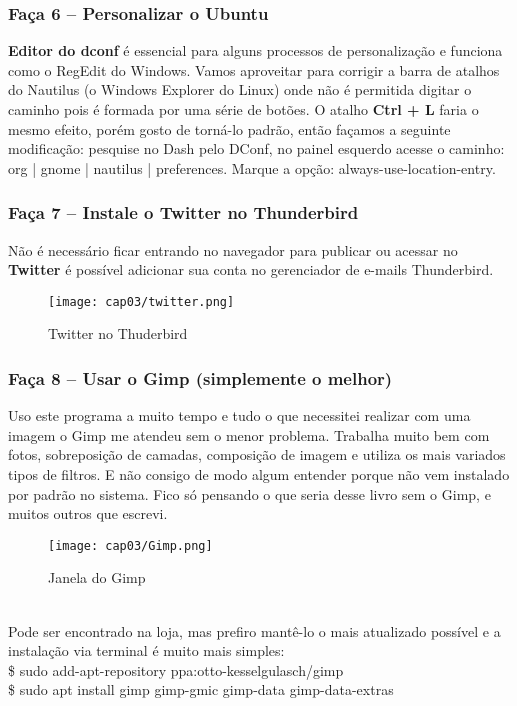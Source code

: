 \subsubsection{Faça 6 – Personalizar o Ubuntu}
\textbf{Editor do dconf} é essencial para alguns processos de personalização e funciona como o RegEdit do Windows. Vamos aproveitar para corrigir a barra de atalhos do Nautilus (o Windows Explorer do Linux) onde não é permitida digitar o caminho pois é formada por uma série de botões. O atalho \textbf{Ctrl + L} faria o mesmo efeito, porém gosto de torná-lo padrão, então façamos a seguinte modificação: pesquise no Dash pelo DConf, no painel esquerdo acesse o caminho: org | gnome | nautilus | preferences. Marque a opção: always-use-location-entry.

\subsubsection{Faça 7 – Instale o Twitter no Thunderbird}
Não é necessário ficar entrando no navegador para publicar ou acessar no \textbf{Twitter} é possível adicionar sua conta no gerenciador de e-mails Thunderbird.
\begin{figure}[H]
\centering\texttt{[image: cap03/twitter.png]}
\caption{Twitter no Thuderbird}
\end{figure}

\subsubsection{Faça 8 – Usar o Gimp (simplemente o melhor)}
Uso este programa a muito tempo e tudo o que necessitei realizar com uma imagem o Gimp me atendeu sem o menor problema. Trabalha muito bem com fotos, sobreposição de camadas, composição de imagem e utiliza os mais variados tipos de filtros. E não consigo de modo algum entender porque não vem instalado por padrão no sistema. Fico só pensando o que seria desse livro sem o Gimp, e muitos outros que escrevi.
\begin{figure}[!h]
 \centering\texttt{[image: cap03/Gimp.png]}
 \caption{Janela do Gimp}
\end{figure} \\
Pode ser encontrado na loja, mas prefiro mantê-lo o mais atualizado possível e a instalação via terminal é muito mais simples: \\
{\ttfamily\$ sudo add-apt-repository ppa:otto-kesselgulasch/gimp} \\
{\ttfamily\$ sudo apt install gimp gimp-gmic gimp-data gimp-data-extras}

